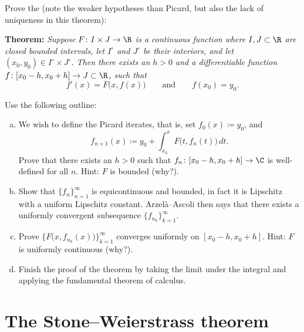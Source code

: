 \begin{exercise} \label{exercise:peanoexistence}
Prove the \emph{} (note the weaker
hypotheses than Picard, but also the lack of
uniqueness in this theorem):

\textbf{Theorem:} \emph{Suppose $F \colon I \times J \to \R$ is 
a continuous function where
$I, J \subset \R$ are closed bounded intervals, 
let $I^\circ$ and $J^\circ$ be their interiors,
and
let $(x_0,y_0) \in I^\circ \times J^\circ$.
Then there exists an $h > 0$ and a differentiable
function $f \colon [x_0 - h, x_0 + h] \to J \subset \R$, such that}
\begin{equation*}
f'(x) = F\bigl(x,f(x)\bigr) \qquad \text{and} \qquad f(x_0) = y_0.
\end{equation*}

Use the following outline:
\begin{enumerate}[a)]
\item
We wish to define the Picard iterates, that is,
set $f_0(x) \coloneqq y_0$, and 
\begin{equation*}
f_{n+1}(x) \coloneqq y_0 + \int_{x_0}^x F\bigl(t,f_n(t)\bigr)\,dt .
\end{equation*}
Prove that there exists an $h > 0$ such that
$f_n \colon [x_0 - h, x_0 + h] \to \C$ is well-defined
for all $n$.  Hint: $F$ is bounded (why?).
\item
Show that $\{ f_n \}_{n=1}^\infty$ is equicontinuous and bounded, in fact it is
Lipschitz with a uniform Lipschitz constant.  Arzel\`a--Ascoli
then says that there exists a
uniformly convergent subsequence $\{ f_{n_k} \}_{k=1}^\infty$.
\item
Prove 
$\bigl\{ F\bigl(x,f_{n_k}(x)\bigr) \bigr\}_{k=1}^\infty$ converges uniformly
on $[x_0-h,x_0+h]$.
Hint: $F$ is uniformly continuous (why?).
\item
Finish the proof of the theorem by taking the limit under the integral
and applying the fundamental theorem of calculus.
\end{enumerate}
\end{exercise}


\sectionnewpage
\section{The Stone--Weierstrass theorem}
\label{sec:stoneweier}



